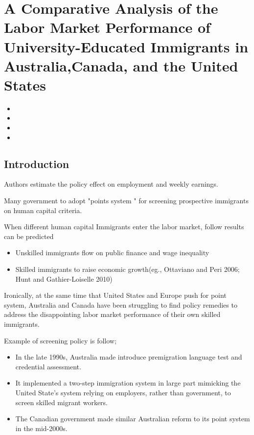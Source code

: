 \documentclass[../root]{subfiles}
\begin{document}
    \chapter{A Comparative Analysis of the Labor Market Performance of University-Educated Immigrants in Australia,Canada, and the United States}

    \begin{shortsummary}
        \begin{itemize}
            \item {} 
            \item {}
            \item {}
            \item {}
        \end{itemize}
    \end{shortsummary}

    \section{Introduction}
    Authors estimate the policy effect on employment and weekly earnings.
    
    Many government to adopt "points system " for screening prospective immigrants on human capital criteria.
    
    When different human capital Immigrants enter the labor market, follow results can be predicted 
    
    \begin{itemize}
        \item Unskilled immigrants flow on public finance and wage inequality
        \item Skilled immigrants to raise economic growth(eg., Ottaviano and Peri 2006; Hunt and Gathier-Loiselle 2010)
    \end{itemize}
    
    Ironically, at the same time that United States and Europe push for point system, Australia and Canada have been struggling to find policy remedies to address the disappointing labor market performance of their own skilled immigrants. 
    
    Example of screening policy is follow;
    \begin{itemize}
        \item In the late 1990s, Australia made introduce premigration language test and credential assessment.
        \item It implemented a two-step immigration system in large part mimicking the United State's system relying on employers, rather than government, to screen skilled migrant workers. 
        \item The Canadian government made similar Australian reform to its point system in the mid-2000s.  
    \end{itemize}
    
\end{document}
